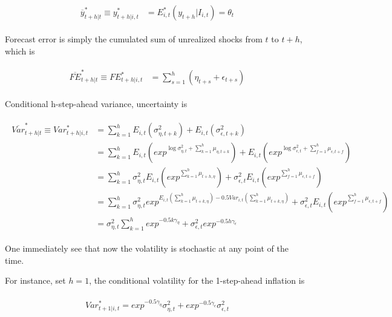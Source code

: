 \documentclass[]{article}
\begin{document}
\begin{eqnarray}
\begin{split}
\overline y^*_{t+h|t} \equiv y^*_{t+h|i,t} & =  E^*_{i,t}(y_{t+h}|I_{i,t}) = \theta_t 
\end{split}
\end{eqnarray}

Forecast error is simply the cumulated sum of unrealized shocks from $t$ to $t+h$, which is 

\begin{eqnarray}
\begin{split}
\overline{FE}^*_{t+h|t} \equiv  FE^*_{t+h|i,t} & =  \sum^{h}_{s=1} (\eta_{t+s} + \epsilon_{t+s})
\end{split}
\end{eqnarray}



Conditional h-step-ahead variance, uncertainty is

\begin{eqnarray}
\begin{split}
\overline{Var}^*_{t+h|t} \equiv  Var^*_{t+h|i,t} & = \sum^{h}_{k=1} E_{i,t}(\sigma^2_{\eta,t+k}) +  E_{i,t}(\sigma^2_{\epsilon,t+k})  \\
& = \sum^{h}_{k=1} E_{i,t}(exp^{\log \sigma^2_{\eta,t}+\sum^h_{k=1}\mu_{\eta,t+k}}) +  E_{i,t}(exp^{\log \sigma^2_{\epsilon,t}+\sum^h_{f=1}\mu_{\epsilon,t+f}} ) \\
& = \sum^{h}_{k=1}\sigma^2_{\eta,t} E_{i,t}(exp^{\sum^h_{k=1}\mu_{t+h,\eta}}) +  \sigma^2_{\epsilon,t} E_{i,t}(exp^{\sum^h_{f=1}\mu_{\epsilon,t+f}} ) \\
& = \sum^{h}_{k=1}\sigma^2_{\eta,t}  exp^{E_{i,t}({\sum^h_{k=1}\mu_{t+k,\eta}})- 0.5Var_{i,t}(\sum^h_{k=1}\mu_{t+k,\eta})} +  \sigma^2_{\epsilon,t} E_{i,t}(exp^{\sum^h_{f=1}\mu_{\epsilon,t+f}} ) \\
& = \sigma^2_{\eta,t} \sum^{h}_{k=1} exp^{- 0.5k\gamma_{\eta}} +  \sigma^2_{\epsilon,t} exp^{- 0.5h\gamma_{\epsilon}} 
\end{split} 
\end{eqnarray}

One immediately see that now the volatility is stochastic at any point of the time. 

For instance, set $h=1$, the conditional volatility for the 1-step-ahead inflation is 

\begin{eqnarray}
\begin{split}
Var^*_{t+1|i,t} =  exp^{- 0.5\gamma_{\eta}} \sigma^2_{\eta,t}  +  exp^{- 0.5\gamma_{\epsilon}} \sigma^2_{\epsilon,t} 
\end{split} 
\end{eqnarray}
\end{document}
